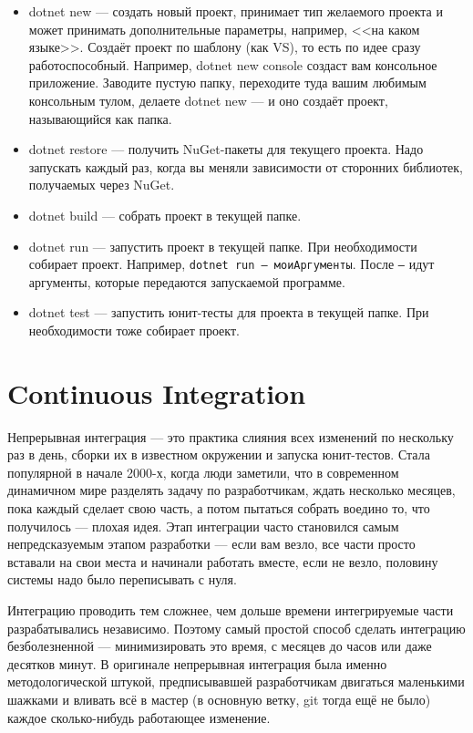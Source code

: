 \documentclass[a5paper]{article}
\begin{document}
\begin{itemize}
    \item dotnet new --- создать новый проект, принимает тип желаемого проекта и может принимать дополнительные параметры, например, <<на каком языке>>. Создаёт проект по шаблону (как VS), то есть по идее сразу работоспособный. Например, dotnet new console создаст вам консольное приложение. Заводите пустую папку, переходите туда вашим любимым консольным тулом, делаете dotnet new --- и оно создаёт проект, называющийся как папка.
    \item dotnet restore --- получить NuGet-пакеты для текущего проекта. Надо запускать каждый раз, когда вы меняли зависимости от сторонних библиотек, получаемых через NuGet.
    \item dotnet build --- собрать проект в текущей папке.
    \item dotnet run --- запустить проект в текущей папке. При необходимости собирает проект. Например, \texttt{dotnet run -- моиАргументы}. После \texttt{--} идут аргументы, которые передаются запускаемой программе.
    \item dotnet test --- запустить юнит-тесты для проекта в текущей папке. При необходимости тоже собирает проект.
\end{itemize}

\section{Continuous Integration}

Непрерывная интеграция --- это практика слияния всех изменений по нескольку раз в день, сборки их в известном окружении и запуска юнит-тестов. Стала популярной в начале 2000-х, когда люди заметили, что в современном динамичном мире разделять задачу по разработчикам, ждать несколько месяцев, пока каждый сделает свою часть, а потом пытаться собрать воедино то, что получилось --- плохая идея. Этап интеграции часто становился самым непредсказуемым этапом разработки --- если вам везло, все части просто вставали на свои места и начинали работать вместе, если не везло, половину системы надо было переписывать с нуля. 

Интеграцию проводить тем сложнее, чем дольше времени интегрируемые части разрабатывались независимо. Поэтому самый простой способ сделать интеграцию безболезненной --- минимизировать это время, с месяцев до часов или даже десятков минут. В оригинале непрерывная интеграция была именно методологической штукой, предписывавшей разработчикам двигаться маленькими шажками и вливать всё в мастер (в основную ветку, git тогда ещё не было) каждое сколько-нибудь работающее изменение.
\end{document}

